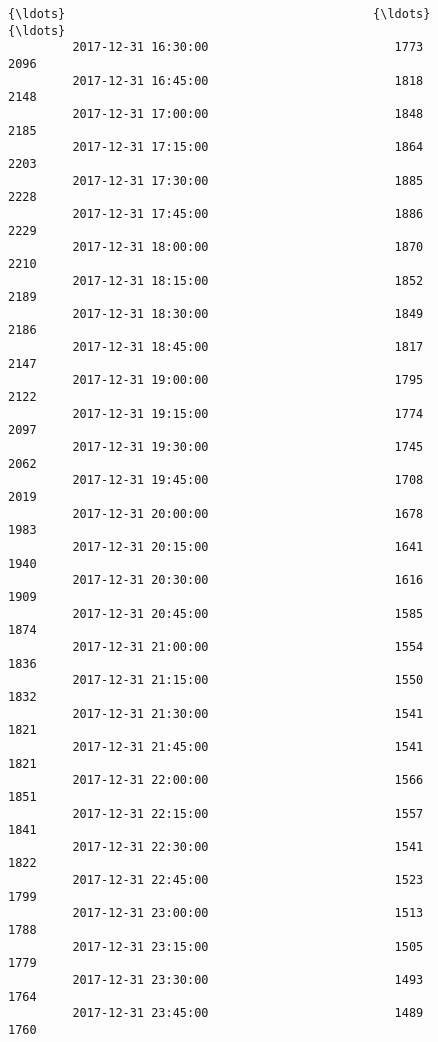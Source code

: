 \documentclass[11pt]{article}
\begin{document}
\begin{Verbatim}[commandchars=\\\{\}]
         {\ldots}                                           {\ldots}                {\ldots}   
         2017-12-31 16:30:00                          1773               2096   
         2017-12-31 16:45:00                          1818               2148   
         2017-12-31 17:00:00                          1848               2185   
         2017-12-31 17:15:00                          1864               2203   
         2017-12-31 17:30:00                          1885               2228   
         2017-12-31 17:45:00                          1886               2229   
         2017-12-31 18:00:00                          1870               2210   
         2017-12-31 18:15:00                          1852               2189   
         2017-12-31 18:30:00                          1849               2186   
         2017-12-31 18:45:00                          1817               2147   
         2017-12-31 19:00:00                          1795               2122   
         2017-12-31 19:15:00                          1774               2097   
         2017-12-31 19:30:00                          1745               2062   
         2017-12-31 19:45:00                          1708               2019   
         2017-12-31 20:00:00                          1678               1983   
         2017-12-31 20:15:00                          1641               1940   
         2017-12-31 20:30:00                          1616               1909   
         2017-12-31 20:45:00                          1585               1874   
         2017-12-31 21:00:00                          1554               1836   
         2017-12-31 21:15:00                          1550               1832   
         2017-12-31 21:30:00                          1541               1821   
         2017-12-31 21:45:00                          1541               1821   
         2017-12-31 22:00:00                          1566               1851   
         2017-12-31 22:15:00                          1557               1841   
         2017-12-31 22:30:00                          1541               1822   
         2017-12-31 22:45:00                          1523               1799   
         2017-12-31 23:00:00                          1513               1788   
         2017-12-31 23:15:00                          1505               1779   
         2017-12-31 23:30:00                          1493               1764   
         2017-12-31 23:45:00                          1489               1760   
         

\end{Verbatim}
\end{document}
